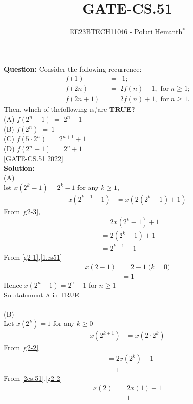 \documentclass[journal,12pt,twocolumn]{IEEEtran}
\theoremstyle{remark}
\begin{document}

\vspace{3cm}

\title{GATE-CS.51}
\author{EE23BTECH11046 - Poluri Hemanth$^{*}$}
\maketitle
\textbf{Question:}
Consider the following recurrence:
\begin{align}
	f(1)\;\;&=\;\;1;\label{g2-1}\\
	 f(2n)\;\;&=\;2f(n)-1,\text{  for $n\geq$1;}\label{g2-2}\\
	 f(2n+1)\;\;&=\;2f(n)+1,\text{  for $n\geq$1.}\label{g2-3}
\end{align}
Then, which of thefollowing is/are \textbf{TRUE?}\\
(A) $f(2^n-1)\;=\;2^n-1$\\
(B) $f(2^n)\;=\;1$\\
(C) $f(5\cdot2^n)\;=\;2^{n+1}+1$\\
(D) $f(2^n+1)\;=\;2^n+1$\\
\hfill{[GATE-CS.51 2022]}\\
\textbf{Solution:}\\
(A)\\
let $x(2^k-1)=2^k-1$ for any $k\geq1$,
\begin{align}
	x(2^{k+1}-1)&=x(2(2^k-1)+1)
\end{align}
From \eqref{g2-3},
\begin{align}
	&=2x(2^k-1)+1\\
        &=2(2^k-1)+1\\
	&=2^{k+1}-1\label{1.cs51}
\end{align}
From \eqref{g2-1},\eqref{1.cs51}
\begin{align}
	x(2-1)&=2-1\text{  ($k=0$)}\\
	&=1
\end{align}
Hence $x(2^n-1)=2^n-1$ for $n\geq1$\\
So statement A is TRUE\\
\\(B)\\
Let $x(2^k)=1$ for any $k\geq$0
\begin{align}
	x(2^{k+1})&=x(2\cdot2^k)
\end{align}
From \eqref{g2-2}
\begin{align}
	&=2x(2^k)-1\label{2cs.51}\\
	&=1
\end{align}
From \eqref{2cs.51},\eqref{g2-2}
\begin{align}
	x(2)&=2x(1)-1\\
	&=1\label{bcs.51}
\end{align}
\end{document}
